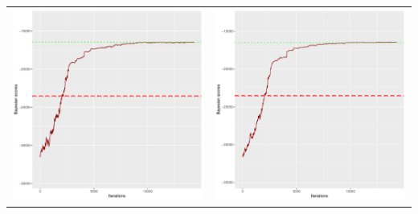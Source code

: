 \documentclass[]{scrartcl}
\begin{document}
\begin{table}[h!]
\begin{tabular}{cc}
\includegraphics[scale = 0.4]{./figs/win95pts/v5/25/bayBoundsEvolution-14252.pdf} & 
\includegraphics[scale = 0.4]{./figs/win95pts/v5/50/bayBoundsEvolution-14252.pdf} \\

\end{tabular}
\end{table}
\end{document}
